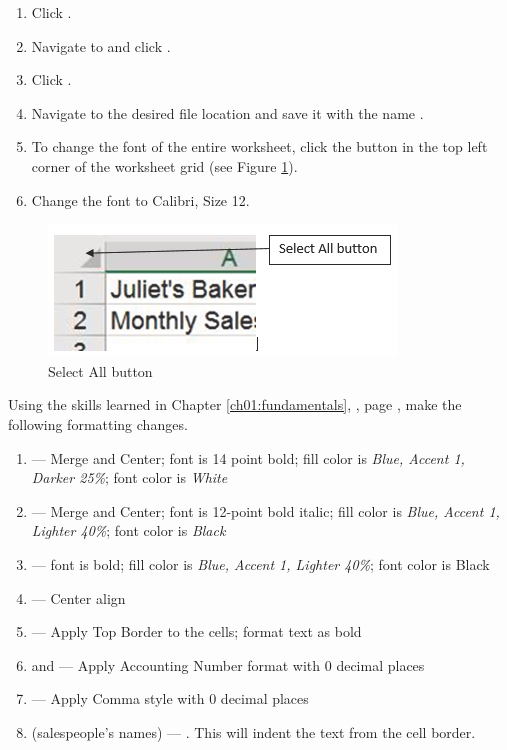 \begin{enumerate}
	\item Click .
	\item Navigate to  and click .
	\item Click .
	\item Navigate to the desired file location and save it with the name .
	\item To change the font of the entire worksheet, click the  button in the top left corner of the worksheet grid (see Figure \ref{02:fig41}).
	\item Change the font to Calibri, Size 12.
\end{enumerate}

\begin{figure}[H]
	\centering
	\includegraphics[width=\maxwidth{.95\linewidth}]{gfx/ch02_fig41}
	\caption{Select All button}
	\label{02:fig41}
\end{figure}

Using the skills learned in Chapter \ref{ch01:fundamentals}, , page \pageref{ch01:fundamentals}, make the following formatting changes.

\begin{enumerate}
	\item {} --- Merge and Center; font is 14 point bold; fill color is \textit{Blue, Accent 1, Darker 25\%}; font color is \textit{White}
	\item {} --- Merge and Center; font is 12-point bold italic; fill color is \textit{Blue, Accent 1, Lighter 40\%}; font color is \textit{Black}
	\item {} --- font is bold; fill color is \textit{Blue, Accent 1, Lighter 40\%}; font color is Black
	\item {} --- Center align
	\item {} --- Apply Top Border to the cells; format text as bold
	\item {} and  --- Apply Accounting Number format with $ 0 $ decimal places
	\item {} --- Apply Comma style with $ 0 $ decimal places
	\item {} (salespeople's names) --- . This will indent the text from the cell border.
\end{enumerate}

